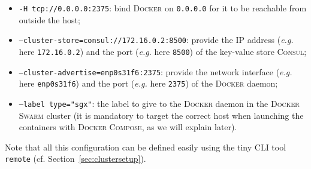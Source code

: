 \begin{itemize}
  \item \texttt{-H tcp://0.0.0.0:2375}: bind \textsc{Docker} on \texttt{0.0.0.0} for it to be reachable from outside the host;
  \item \texttt{--cluster-store=consul://172.16.0.2:8500}: provide the IP address (\textit{e.g.} here \texttt{172.16.0.2}) and the port (\textit{e.g.} here \texttt{8500}) of the key-value store \textsc{Consul};
  \item \texttt{--cluster-advertise=enp0s31f6:2375}: provide the network interface (\textit{e.g.} here \texttt{enp0s31f6}) and the port (\textit{e.g.} here \texttt{2375}) of the \textsc{Docker} daemon;
  \item \texttt{--label type="sgx"}: the label to give to the \textsc{Docker} daemon in the \textsc{Docker Swarm} cluster (it is mandatory to target the correct host when launching the containers with \textsc{Docker Compose}, as we will explain later).
\end{itemize}

Note that all this configuration can be defined easily using the tiny CLI tool \texttt{remote} (cf. Section~\ref{sec:clustersetup}).
